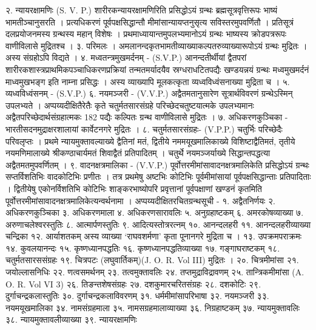 २. न्यायरक्षामणिः (S. V. P.)
शारीरकन्यायरक्षामणिरिति प्रसिद्धोऽयं ग्रन्थः ब्रह्मसूत्रवृत्तिरूपः भाष्यं भामतीञ्चानुसरति । प्रत्यधिकरणं पूर्वपक्षसिद्धान्तौ मीमांसान्यायप्तनुसृत्य सविस्तरमुपवर्णितौ । प्रतिसूत्रं दलप्रयोजनमस्य ग्रन्थस्य महान् विशेषः । प्रथमाध्यायान्तमुपलभ्यमानोऽयं ग्रन्थः भाष्यस्य क्रोडपत्ररूपः वाणीविलासे मुद्रितश्च ।
३. परिमलः । अमलानन्दकृतभामतीव्याख्याकल्पतरुव्याख्यारूपोऽयं ग्रन्थः मुद्रितः । अस्य संग्रहोऽपि विद्यते ।
४. मध्वतन्त्रमुखमर्दनम् - (S.V.P.)
आनन्दतीर्थीयां द्वैतपरां शारीरकशास्त्रप्राथमिकपञ्चाधिकरणप्रक्रियां तन्मतमर्यादयैव स्रग्धराधटितपद्यैः खण्डयन्नयं ग्रन्थः मध्वमुखमर्दनं माध्वमुखभङ्ग इति नाम्ना प्रसिद्धः । अस्य व्याख्यापि मूलकत्कृता व्यध्वविध्वंसनाख्या मुद्रिता च ।
५. व्यध्वविध्वंसनम् - (S.V.P.)
६. नयमञ्जरी - (V.V.P.)
अद्वैतमतानुसारेण सूत्रार्थविवरणं ग्रन्थेऽस्मिन् उपलभ्यते । अप्पय्यदीक्षितैरेतैः कृते चतुर्मतसारसंग्रहे परिच्छेदचतुष्टयात्मके उपलभ्यमानः अद्वैतपरिच्छेदार्थसंग्रहात्मकः 182 पद्यैः कल्पितः ग्रन्थ वाणीविलासे मुद्रितः ।
७. अधिकरणकुञ्चिका - भारतीसदनमुद्राक्षरशालायां कार्वेटनगरे मुद्रितः ।
८. चतुर्मतसारसंग्रहः- (V.P.P.)
चतुर्भिः परिच्छेदैः परिवलृप्तः । प्रथमे न्यायमुक्तावल्याख्ये द्वैतिनां मतं, द्वितीये नममयूखमालिकाख्ये विशिष्टाद्वैतिमतं, तृतीये नयमणिमालाख्ये श्रीकण्ठाचार्यमतं शिवाद्वैतं प्रतिपादितम् । चतुर्थे नयमञ्जर्याख्ये सिद्धान्तपद्धत्या अद्वैतमतमुपवर्णितम् ।
९. वादनक्षत्रमालिका - (V.V.P.)
पूर्वोत्तरमीमांसावादनक्षत्रमालिकेति प्रसिद्धोऽयं ग्रन्थः सप्तर्विशतिभिः वादकोटिभिः प्रणीतः । तत्र प्रथमेषु अष्टभिः कोटिभिः पूर्वमीमांसायां पूर्वपक्षसिद्धान्ताः प्रतिपादिताः । द्वितीयेषु एकोनर्विशतिभि कोटिभिः शाङ्करभाष्योपरि प्रवृत्तानां पूर्वपक्षाणां खण्डनं कृतमिति पूर्वोत्तरमीमांसावादनक्षत्रमालिकेत्यन्वर्थनामा ।
अप्पय्यदीक्षितरचितग्रन्थसूची -
१. अद्वैतनिर्णयः 
२. अधिकरणकुञ्चिका
३. अधिकरणमाला
४. अधिकरणसारावलिः
५. अनुग्रहाष्टकम् 
६. अमरकोषव्याख्या
७. अरुणाचलेश्वरस्तुतिः 
८. आत्मार्पणस्तुतिः
९. आदित्यस्तोत्ररत्नम् 
१०. आनन्दलहरी
११. आनन्दलहरीव्याख्या चन्द्रिका 
१२. आर्याशतकम् अस्य व्याख्या `राघवशर्मणा' कृता पूनानगरे मुद्रिता च ।
१३. उपक्रमपराक्रमः
१४. कुवलयानन्दः
१५. कृष्णध्यानपद्धतिः
१६. कृष्णध्यानपद्धतिव्याख्या
१७. गङ्गाघराष्टकम् 
१८. चतुर्मतसारससंग्रहः
१९. चित्रपटः (लघुवार्तिकम्)(J. O. R. Vol III) मुद्रितः ।
२०. चित्रमीमांसा
२१. जयोल्लासनिधिः
२२. णत्वसमर्थनम्
२३. तत्वमुक्तावलिः
२४. तप्तमुद्राविद्रावणम् 
२५. तान्त्रिकमीमांसा (A. O. R. Vol VI 3)
२६. तिङन्तशेषसंग्रहः
२७. दशकुमारचरितसंग्रहः
२८. दशकोटिः
२९. दुर्गाचन्द्रकलास्तुतिः
३०. दुर्गाचन्द्रकलाविवरणम् 
३१. धर्ममीमांसापरिभाषा
३२. नयमञ्जरी
३३. नयमयूखमालिका
३४. नामसंग्रहमाला
३५. नामसग्रहमालाव्याख्या
३६. निग्रहाष्टकम्
३७. न्यायमुक्तावलिः
३८. न्यायमुक्तावलीव्याख्या
३९. न्यायरक्षामणिः
